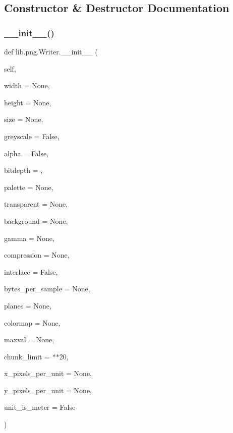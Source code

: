 \subsection{Constructor \& Destructor Documentation}
\mbox{\label{classlib_1_1png_1_1_writer_a28a09bbc70676c1ba0ab623f207372e9}} 
\subsubsection{\texorpdfstring{\+\_\+\+\_\+init\+\_\+\+\_\+()}{\_\_init\_\_()}}
{\footnotesize\ttfamily def lib.\+png.\+Writer.\+\_\+\+\_\+init\+\_\+\+\_\+ (\begin{DoxyParamCaption}\item[{}]{self,  }\item[{}]{width = {\ttfamily None},  }\item[{}]{height = {\ttfamily None},  }\item[{}]{size = {\ttfamily None},  }\item[{}]{greyscale = {\ttfamily False},  }\item[{}]{alpha = {\ttfamily False},  }\item[{}]{bitdepth = {},  }\item[{}]{palette = {\ttfamily None},  }\item[{}]{transparent = {\ttfamily None},  }\item[{}]{background = {\ttfamily None},  }\item[{}]{gamma = {\ttfamily None},  }\item[{}]{compression = {\ttfamily None},  }\item[{}]{interlace = {\ttfamily False},  }\item[{}]{bytes\+\_\+per\+\_\+sample = {\ttfamily None},  }\item[{}]{planes = {\ttfamily None},  }\item[{}]{colormap = {\ttfamily None},  }\item[{}]{maxval = {\ttfamily None},  }\item[{}]{chunk\+\_\+limit = {$\ast$$\ast$20},  }\item[{}]{x\+\_\+pixels\+\_\+per\+\_\+unit = {\ttfamily None},  }\item[{}]{y\+\_\+pixels\+\_\+per\+\_\+unit = {\ttfamily None},  }\item[{}]{unit\+\_\+is\+\_\+meter = {\ttfamily False} }\end{DoxyParamCaption})}


